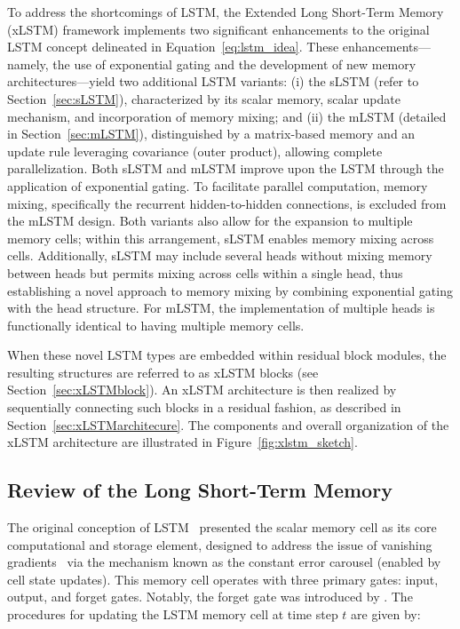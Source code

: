 To address the shortcomings of LSTM, the Extended Long Short-Term Memory (xLSTM) framework implements two significant enhancements to the original LSTM concept delineated in Equation~\eqref{eq:lstm_idea}. These enhancements—namely, the use of exponential gating and the development of new memory architectures—yield two additional LSTM variants: (i) the sLSTM (refer to Section~\ref{sec:sLSTM}), characterized by its scalar memory, scalar update mechanism, and incorporation of memory mixing; and (ii) the mLSTM (detailed in Section~\ref{sec:mLSTM}), distinguished by a matrix-based memory and an update rule leveraging covariance (outer product), allowing complete parallelization. Both sLSTM and mLSTM improve upon the LSTM through the application of exponential gating. To facilitate parallel computation, memory mixing, specifically the recurrent hidden-to-hidden connections, is excluded from the mLSTM design. Both variants also allow for the expansion to multiple memory cells; within this arrangement, sLSTM enables memory mixing across cells. Additionally, sLSTM may include several heads without mixing memory between heads but permits mixing across cells within a single head, thus establishing a novel approach to memory mixing by combining exponential gating with the head structure. For mLSTM, the implementation of multiple heads is functionally identical to having multiple memory cells.

When these novel LSTM types are embedded within residual block modules, the resulting structures are referred to as xLSTM blocks (see Section~\ref{sec:xLSTMblock}). An xLSTM architecture is then realized by sequentially connecting such blocks in a residual fashion, as described in Section~\ref{sec:xLSTMarchitecure}. The components and overall organization of the xLSTM architecture are illustrated in Figure~\ref{fig:xlstm_sketch}.

\subsection{Review of the Long Short-Term Memory}
\label{sec:orgLSTM}

The original conception of LSTM~\citep{Hochreiter:91,Hochreiter:97nips,Hochreiter:97} presented the scalar memory cell as its core computational and storage element, designed to address the issue of vanishing gradients~\citep{Hochreiter:91,Hochreiter:00book} via the mechanism known as the constant error carousel (enabled by cell state updates). This memory cell operates with three primary gates: input, output, and forget gates. Notably, the forget gate was introduced by \citet{Gers:00}. The procedures for updating the LSTM memory cell at time step $t$ are given by:

